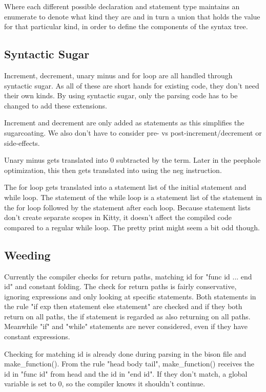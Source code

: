 \documentclass{article}
\begin{document}
Where each different possible declaration and statement type maintains an enumerate to denote what kind they are and in turn a union that holds the value for that particular kind, in order to define the components of the syntax tree.

\subsection{Syntactic Sugar}
Increment, decrement, unary minus and for loop are all handled through syntactic sugar. As all of these are short hands for existing code, they don't need their own kinds. By using syntactic sugar, only the parsing code has to be changed to add these extensions.

Increment and decrement are only added as statements as this simplifies the sugarcoating. We also don't have to consider pre- vs post-increment/decrement or side-effects.  

Unary minus gets translated into 0 subtracted by the term. Later in the peephole optimization, this then gets translated into using the neg instruction.

The for loop gets translated into a statement list of the initial statement and while loop. The statement of the while loop is a statement list of the statement in the for loop followed by the statement after each loop. Because statement lists don't create separate scopes in Kitty, it doesn't affect the compiled code compared to a regular while loop. The pretty print might seem a bit odd though.

\subsection{Weeding}


Currently the compiler checks for return paths, matching id for "func id ... end id" and constant folding. The check for return paths is fairly conservative, ignoring expressions and only looking at specific statements. Both statements in the rule "if exp then statement else statement" are checked and if they both return on all paths, the if statement is regarded as also returning on all paths. Meanwhile "if" and "while" statements are never considered, even if they have constant expressions. 

Checking for matching id is already done during parsing in the bison file and make\_function(). From the rule "head body tail", make\_function() receives the id in "func id" from head and the id in "end id". If they don't match, a global variable is set to 0, so the compiler knows it shouldn't continue.
\end{document}
